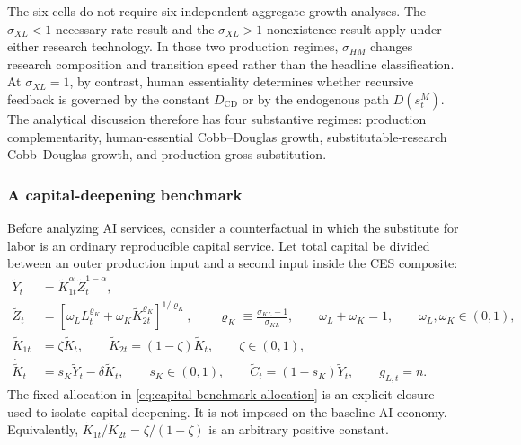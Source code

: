 The six cells do not require six independent aggregate-growth analyses. The
$\sigma_{XL}<1$ necessary-rate result and the $\sigma_{XL}>1$ nonexistence result
apply under either research technology. In those two production regimes,
$\sigma_{HM}$ changes research composition and transition speed rather than the
headline classification. At $\sigma_{XL}=1$, by contrast, human essentiality
determines whether recursive feedback is governed by the constant
$D_{\mathrm{CD}}$ or by the endogenous path $D(s^M_t)$. The analytical discussion
therefore has four substantive regimes: production complementarity, human-essential
Cobb--Douglas growth, substitutable-research Cobb--Douglas growth, and production
gross substitution.

\subsubsection{A capital-deepening benchmark}
\label{sec:capital-deepening-benchmark}

Before analyzing AI services, consider a counterfactual in which the substitute for
labor is an ordinary reproducible capital service. Let total capital be divided
between an outer production input and a second input inside the CES composite:
\begin{align}
    \widetilde Y_t
    &=
    \widetilde K_{1t}^{\alpha}\widetilde Z_t^{1-\alpha},
    \label{eq:capital-benchmark-production}\\
    \widetilde Z_t
    &=
    \left[
        \omega_L L_t^{\varrho_K}
        +\omega_K\widetilde K_{2t}^{\varrho_K}
    \right]^{1/\varrho_K},
    \qquad
    \varrho_K\equiv
    \frac{\sigma_{KL}-1}{\sigma_{KL}},
    \qquad \omega_L+\omega_K=1,
    \qquad \omega_L,\omega_K\in(0,1),
    \label{eq:capital-benchmark-ces}\\
    \widetilde K_{1t}
    &=\zeta\widetilde K_t,
    \qquad
    \widetilde K_{2t}=(1-\zeta)\widetilde K_t,
    \qquad \zeta\in(0,1),
    \label{eq:capital-benchmark-allocation}\\
    \dot{\widetilde K}_t
    &=s_K\widetilde Y_t-\delta\widetilde K_t,
    \qquad s_K\in(0,1),
    \qquad
    \widetilde C_t=(1-s_K)\widetilde Y_t,
    \qquad g_{L,t}=n.
    \label{eq:capital-benchmark-accumulation}
\end{align}
The fixed allocation in \eqref{eq:capital-benchmark-allocation} is an explicit
closure used to isolate capital deepening. It is not imposed on the baseline AI
economy. Equivalently,
$\widetilde K_{1t}/\widetilde K_{2t}=\zeta/(1-\zeta)$ is an arbitrary positive
constant.

